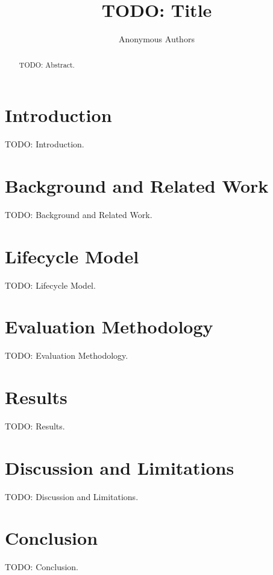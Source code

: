 \documentclass[11pt]{article}
\title{TODO: Title}
\author{Anonymous Authors}
\date{}
\begin{document}
\maketitle

\begin{abstract}
TODO: Abstract.
\end{abstract}

\section{Introduction}
TODO: Introduction.

\section{Background and Related Work}
TODO: Background and Related Work.

\section{Lifecycle Model}
TODO: Lifecycle Model.

\section{Evaluation Methodology}
TODO: Evaluation Methodology.

\section{Results}
TODO: Results.

\section{Discussion and Limitations}
TODO: Discussion and Limitations.

\section{Conclusion}
TODO: Conclusion.


\end{document}
